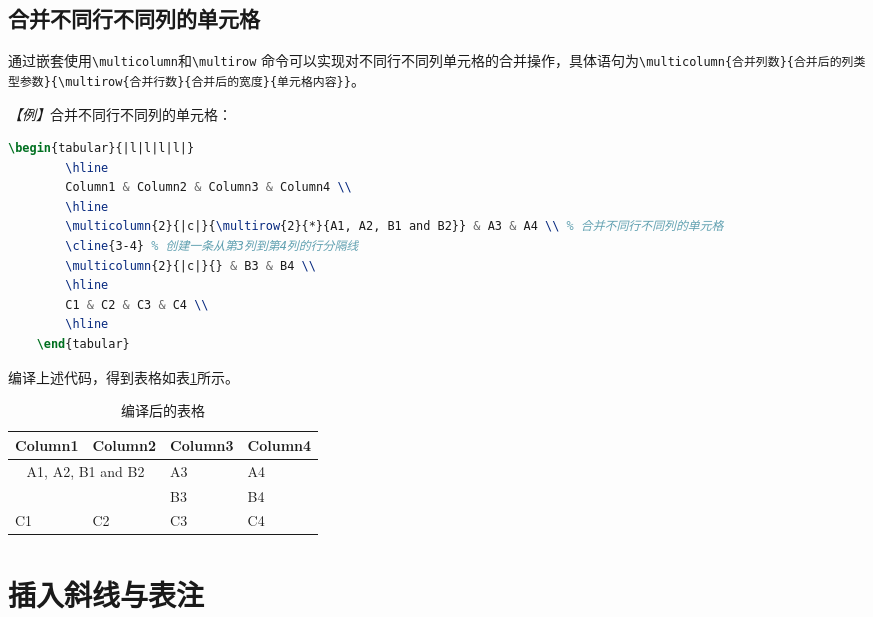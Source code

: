 \subsection{合并不同行不同列的单元格}
通过嵌套使用\texttt{\textbackslash{}multicolumn}和\texttt{\textbackslash{}multirow}
命令可以实现对不同行不同列单元格的合并操作，具体语句为\texttt{\textbackslash{}multicolumn\{合并列数\}\{合并后的列类型参数\}\{\textbackslash{}multirow\{合并行数\}\{合并后的宽度\}\{单元格内容\}\}}。

\emph{【例】}合并不同行不同列的单元格：
\begin{lstlisting}[language=TeX]
    \begin{tabular}{|l|l|l|l|}
        \hline
        Column1 & Column2 & Column3 & Column4 \\
        \hline
        \multicolumn{2}{|c|}{\multirow{2}{*}{A1, A2, B1 and B2}} & A3 & A4 \\ % 合并不同行不同列的单元格
        \cline{3-4} % 创建一条从第3列到第4列的行分隔线
        \multicolumn{2}{|c|}{} & B3 & B4 \\
        \hline
        C1 & C2 & C3 & C4 \\
        \hline
    \end{tabular}
\end{lstlisting}

编译上述代码，得到表格如表\ref{tb6}所示。
\begin{table}[h]
    \centering
    \begin{tabular}{|l|l|l|l|}
        \hline
        Column1                                                  & Column2 & Column3 & Column4 \\
        \hline
        \multicolumn{2}{|c|}{\multirow{2}{*}{A1, A2, B1 and B2}} & A3      & A4                \\ %
        \cline{3-4} %
        \multicolumn{2}{|c|}{}                                   & B3      & B4                \\
        \hline
        C1                                                       & C2      & C3      & C4      \\
        \hline
    \end{tabular}
    \caption{编译后的表格}
    \label{tb6}
\end{table}

\section{插入斜线与表注}

